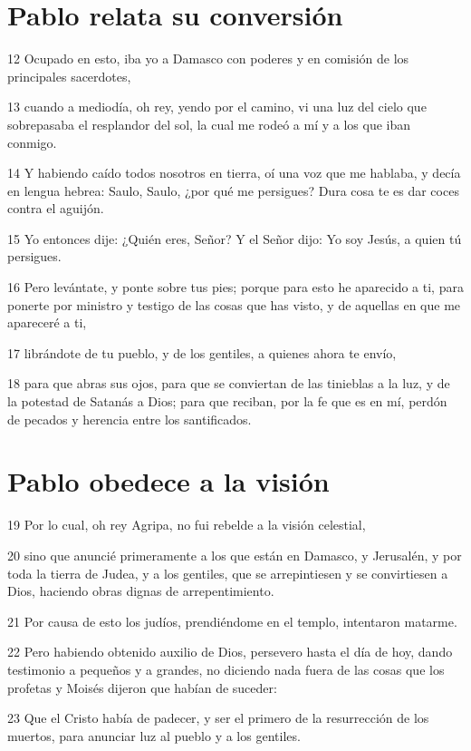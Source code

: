 \section*{Pablo relata su conversión}

\par 12 Ocupado en esto, iba yo a Damasco con poderes y en comisión de los principales sacerdotes,
\par 13 cuando a mediodía, oh rey, yendo por el camino, vi una luz del cielo que sobrepasaba el resplandor del sol, la cual me rodeó a mí y a los que iban conmigo.
\par 14 Y habiendo caído todos nosotros en tierra, oí una voz que me hablaba, y decía en lengua hebrea: Saulo, Saulo, ¿por qué me persigues? Dura cosa te es dar coces contra el aguijón.
\par 15 Yo entonces dije: ¿Quién eres, Señor? Y el Señor dijo: Yo soy Jesús, a quien tú persigues.
\par 16 Pero levántate, y ponte sobre tus pies; porque para esto he aparecido a ti, para ponerte por ministro y testigo de las cosas que has visto, y de aquellas en que me apareceré a ti,
\par 17 librándote de tu pueblo, y de los gentiles, a quienes ahora te envío,
\par 18 para que abras sus ojos, para que se conviertan de las tinieblas a la luz, y de la potestad de Satanás a Dios; para que reciban, por la fe que es en mí, perdón de pecados y herencia entre los santificados.

\section*{Pablo obedece a la visión}

\par 19 Por lo cual, oh rey Agripa, no fui rebelde a la visión celestial,
\par 20 sino que anuncié primeramente a los que están en Damasco, y Jerusalén, y por toda la tierra de Judea, y a los gentiles, que se arrepintiesen y se convirtiesen a Dios, haciendo obras dignas de arrepentimiento.
\par 21 Por causa de esto los judíos, prendiéndome en el templo, intentaron matarme.
\par 22 Pero habiendo obtenido auxilio de Dios, persevero hasta el día de hoy, dando testimonio a pequeños y a grandes, no diciendo nada fuera de las cosas que los profetas y Moisés dijeron que habían de suceder:
\par 23 Que el Cristo había de padecer, y ser el primero de la resurrección de los muertos, para anunciar luz al pueblo y a los gentiles.

